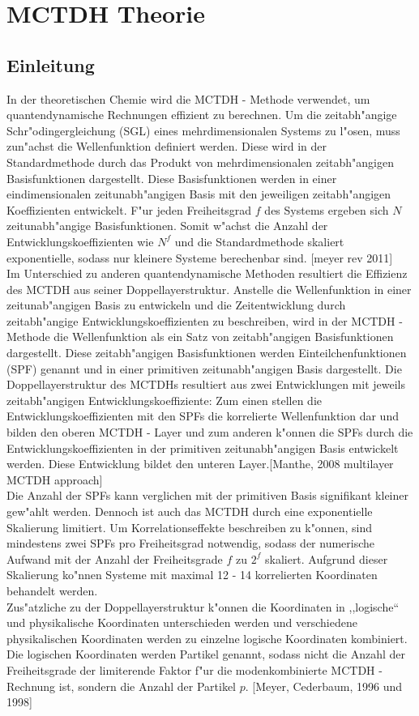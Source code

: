 \chapter{MCTDH Theorie}

\section{Einleitung}

In der theoretischen Chemie wird die MCTDH - Methode verwendet, um quantendynamische Rechnungen effizient zu berechnen.
Um die zeitabh"angige Schr"odingergleichung (SGL) eines mehrdimensionalen Systems zu l"osen, muss zun"achst die Wellenfunktion definiert werden.
Diese wird in der Standardmethode durch das Produkt von mehrdimensionalen zeitabh"angigen Basisfunktionen dargestellt. Diese Basisfunktionen werden in
einer eindimensionalen zeitunabh"angigen Basis mit den jeweiligen zeitabh"angigen Koeffizienten entwickelt.
F"ur jeden Freiheitsgrad $f$ des Systems ergeben sich $N$ zeitunabh"angige Basisfunktionen. Somit w"achst die Anzahl der Entwicklungskoeffizienten wie $N^{f}$ und
die Standardmethode skaliert exponentielle, sodass nur kleinere Systeme berechenbar sind. [meyer rev 2011]
  \\ Im Unterschied zu anderen quantendynamische Methoden resultiert die Effizienz des MCTDH aus seiner Doppellayerstruktur.
Anstelle die Wellenfunktion in einer zeitunab"angigen Basis zu entwickeln und die Zeitentwicklung durch zeitabh"angige Entwicklungskoeffizienten zu beschreiben,
wird in der MCTDH - Methode die Wellenfunktion als ein Satz von zeitabh"angigen Basisfunktionen dargestellt.
Diese zeitabh"angigen Basisfunktionen werden Einteilchenfunktionen (SPF) genannt und in einer primitiven zeitunabh"angigen Basis dargestellt.
Die Doppellayerstruktur des MCTDHs resultiert aus zwei Entwicklungen mit jeweils zeitabh"angigen Entwicklungskoeffiziente:
Zum einen stellen die Entwicklungskoeffizienten mit den SPFs die korrelierte Wellenfunktion dar und bilden den oberen MCTDH -
Layer und zum anderen k"onnen die SPFs durch die Entwicklungskoeffizienten in der primitiven zeitunabh"angigen Basis entwickelt werden. Diese Entwicklung bildet
den unteren Layer.[Manthe, 2008 multilayer MCTDH approach]
  \\ Die Anzahl der SPFs kann verglichen mit der primitiven Basis signifikant kleiner gew"ahlt werden.
Dennoch ist auch das MCTDH durch eine exponentielle Skalierung limitiert.
Um Korrelationseffekte beschreiben zu k"onnen, sind mindestens zwei SPFs pro Freiheitsgrad notwendig, sodass der numerische Aufwand mit der Anzahl der
Freiheitsgrade $f$ zu $2^f$ skaliert. Aufgrund dieser Skalierung ko"nnen Systeme mit maximal 12 - 14 korrelierten Koordinaten behandelt werden.
  \\ Zus"atzliche zu der Doppellayerstruktur k"onnen die Koordinaten in ,,logische`` und physikalische Koordinaten unterschieden werden und
  verschiedene physikalischen Koordinaten werden zu einzelne logische Koordinaten kombiniert. Die logischen Koordinaten werden Partikel genannt, sodass
  nicht die Anzahl der Freiheitsgrade der limiterende Faktor f"ur die modenkombinierte MCTDH - Rechnung ist,
  sondern die Anzahl der Partikel $p$. [Meyer, Cederbaum, 1996 und 1998]


